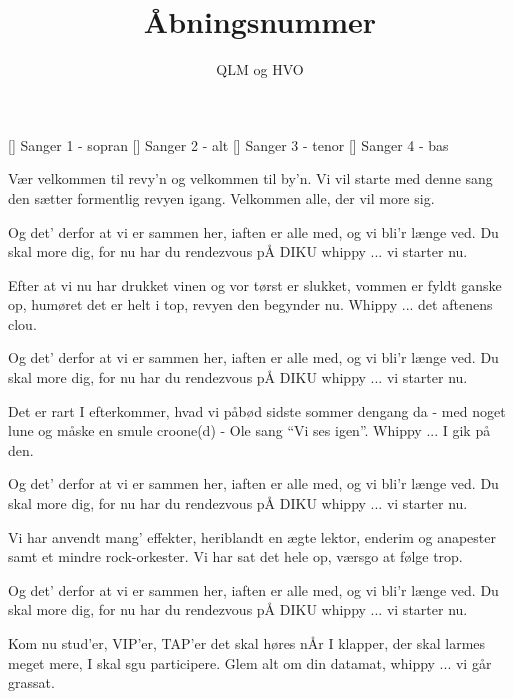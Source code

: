 \documentclass[a4paper,11pt]{article}
\title{Åbningsnummer}
\author{QLM og HVO}
\begin{document}
\maketitle

\begin{roles}
[] Sanger 1 - sopran
[] Sanger 2 - alt
[] Sanger 3 - tenor
[] Sanger 4 - bas
\end{roles}

\begin{song}




%
Vær velkommen til revy'n
og velkommen til by'n.
Vi vil starte med denne sang
den sætter formentlig revyen igang.
Velkommen alle, der vil more sig.


%
Og det' derfor at vi er sammen her,
iaften er alle med,
og vi bli'r længe ved.
Du skal more dig, for nu har du
rendezvous
pÅ DIKU
whippy ... vi starter nu.

%
 Efter at vi nu har drukket
vinen og vor tørst er slukket,
vommen er fyldt ganske op,
humøret det er helt i top,
revyen den begynder nu.
Whippy ... det aftenens clou.

%
Og det' derfor at vi er sammen her,
iaften er alle med,
og vi bli'r længe ved.
Du skal more dig, for nu har du
rendezvous
pÅ DIKU
whippy ... vi starter nu.

%
Det er rart I efterkommer,
hvad vi påbød sidste sommer
dengang da - med noget lune
og måske en smule croone(d) -
Ole sang ``Vi ses igen''.
Whippy ... I gik på den.

%
Og det' derfor at vi er sammen her,
iaften er alle med,
og vi bli'r længe ved.
Du skal more dig, for nu har du
rendezvous
pÅ DIKU
whippy ... vi starter nu.

%
Vi har anvendt mang' effekter,
heriblandt en ægte lektor,
enderim og anapester
samt et mindre rock-orkester.
Vi har sat det hele op,
værsgo at følge trop.

%
Og det' derfor at vi er sammen her,
iaften er alle med,
og vi bli'r længe ved.
Du skal more dig, for nu har du
rendezvous
pÅ DIKU
whippy ... vi starter nu.

%
Kom nu stud'er, VIP'er, TAP'er
det skal høres nÅr I klapper,
der skal larmes meget mere,
I skal sgu participere.
Glem alt om din datamat,
whippy ... vi går grassat.

\end{song}
\end{document}
